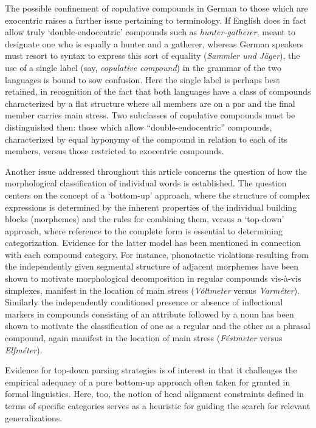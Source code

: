 \documentclass[output=paper
 ,nobabel
 ,draftmode
 ,colorlinks, citecolor=brown
]{langscibook}
\begin{document}
The possible confinement of copulative compounds in German to those which are exocentric raises a
further issue pertaining to terminology. If English does in fact allow truly `double-endocentric'
compounds such as \emph{hunter-gatherer}, meant to designate one who is equally a hunter and a
gatherer, whereas German speakers must resort to syntax to express this sort of equality
(\emph{Sammler und Jäger}), the use of a single label (say, \emph{copulative compound}) in the
grammar of the two languages is bound to sow confusion. Here the single label is perhaps
best retained, in recognition of the fact that both languages have a class of compounds
characterized by a flat structure where all members are on a par and the final member carries main
stress. 
Two subclasses of copulative compounds must be distinguished then: those which allow
``double-endocentric'' compounds, characterized by equal hyponymy of the compound in relation to
each of its members, versus those restricted to exocentric compounds.

Another issue addressed throughout this article concerns the question of how the morphological
classification of individual words is established. The question centers on the concept of a  
`bottom-up' approach, where the structure of complex expressions is determined by the inherent
properties of the individual building blocks (morphemes) and the rules for combining them, versus a  
`top-down' approach, where reference to the complete form is essential to determining
categorization. Evidence for the latter model has been mentioned in connection with each compound
category, For instance, phonotactic violations resulting from the independently given segmental
structure of adjacent morphemes have been shown to motivate morphological decomposition in regular
compounds vis-à-vis simplexes, manifest in the location of main stress (\emph{Vóltmeter} versus
\emph{Varméter}). Similarly the independently conditioned presence or absence of inflectional
markers in compounds consisting of an attribute followed by a noun has been shown to motivate the
classification of one as a regular and the other as a phrasal compound, again manifest in the
location of main stress (\emph{Féstmeter} versus \emph{Elfméter}). 

Evidence for top-down parsing strategies is of interest in that it challenges the empirical adequacy of a pure bottom-up approach often taken for granted in formal linguistics. Here, too, the notion of head alignment constraints defined in terms of specific categories serves as a heuristic for guiding the search for relevant generalizations.
\end{document}
